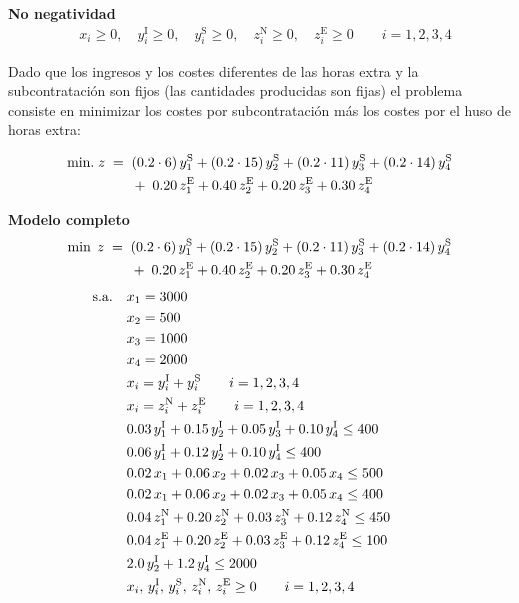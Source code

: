 

\textbf{No negatividad}\\[0.2cm]
\begin{align}
& x_i \ge 0,\quad y_i^{\mathrm{I}} \ge 0,\quad y_i^{\mathrm{S}} \ge 0,\quad
  z_i^{\mathrm{N}} \ge 0,\quad z_i^{\mathrm{E}} \ge 0
\qquad i=1,2,3,4
\end{align}


Dado que los ingresos y los costes diferentes de las horas extra y la subcontratación son fijos (las cantidades producidas son fijas) el problema consiste en minimizar los costes por subcontratación más los costes por el huso de horas extra:

\begin{align}
\mbox{min.} \; z \;=\;
&\; (0.2\cdot 6)\,y_1^{\mathrm{S}} + (0.2\cdot 15)\,y_2^{\mathrm{S}} + (0.2\cdot 11)\,y_3^{\mathrm{S}} + (0.2\cdot 14)\,y_4^{\mathrm{S}} \notag \\
&\;+\; 0.20\,z_1^{\mathrm{E}} + 0.40\,z_2^{\mathrm{E}} + 0.20\,z_3^{\mathrm{E}} + 0.30\,z_4^{\mathrm{E}}
\end{align}


\textbf{Modelo completo}
\begin{align}
\min\; z \;=\;
&\; (0.2\cdot 6)\,y_1^{\mathrm{S}} + (0.2\cdot 15)\,y_2^{\mathrm{S}}
   + (0.2\cdot 11)\,y_3^{\mathrm{S}} + (0.2\cdot 14)\,y_4^{\mathrm{S}} \notag \\
&\;+\; 0.20\,z_1^{\mathrm{E}} + 0.40\,z_2^{\mathrm{E}}
       + 0.20\,z_3^{\mathrm{E}} + 0.30\,z_4^{\mathrm{E}}
\\[4pt]
\text{s.a.}\quad
& x_1 = 3000 \notag \\ 
& x_2 = 500\notag \\
& x_3 = 1000\notag \\
& x_4 = 2000 \notag \\
& x_i = y_i^{\mathrm{I}} + y_i^{\mathrm{S}} \qquad i=1,2,3,4 \notag \\
& x_i = z_i^{\mathrm{N}} + z_i^{\mathrm{E}} \qquad i=1,2,3,4 \notag \\
& 0.03\,y_1^{\mathrm{I}} + 0.15\,y_2^{\mathrm{I}} + 0.05\,y_3^{\mathrm{I}} + 0.10\,y_4^{\mathrm{I}} \le 400 \notag \\
& 0.06\,y_1^{\mathrm{I}} + 0.12\,y_2^{\mathrm{I}} + 0.10\,y_4^{\mathrm{I}} \le 400 \notag \\
& 0.02\,x_1 + 0.06\,x_2 + 0.02\,x_3 + 0.05\,x_4 \le 500 \notag \\
& 0.02\,x_1 + 0.06\,x_2 + 0.02\,x_3 + 0.05\,x_4 \le 400 \notag \\
& 0.04\,z_1^{\mathrm{N}} + 0.20\,z_2^{\mathrm{N}} + 0.03\,z_3^{\mathrm{N}} + 0.12\,z_4^{\mathrm{N}} \le 450 \notag \\
& 0.04\,z_1^{\mathrm{E}} + 0.20\,z_2^{\mathrm{E}} + 0.03\,z_3^{\mathrm{E}} + 0.12\,z_4^{\mathrm{E}} \le 100 \notag \\
& 2.0\,y_2^{\mathrm{I}} + 1.2\,y_4^{\mathrm{I}} \le 2000 \notag \\
& x_i,\,y_i^{\mathrm{I}},\,y_i^{\mathrm{S}},\,z_i^{\mathrm{N}},\,z_i^{\mathrm{E}} \ge 0 \qquad i=1,2,3,4 \notag
\end{align}


